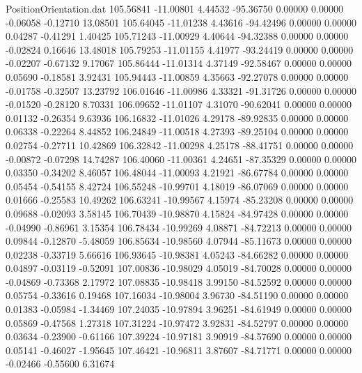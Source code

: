 \begin{filecontents}{PositionOrientation.dat}
 105.56841  -11.00801    4.44532   -95.36750    0.00000    0.00000   -0.06058   -0.12710   13.08501
 105.64045  -11.01238    4.43616   -94.42496    0.00000    0.00000    0.04287   -0.41291    1.40425
 105.71243  -11.00929    4.40644   -94.32388    0.00000    0.00000   -0.02824    0.16646   13.48018
 105.79253  -11.01155    4.41977   -93.24419    0.00000    0.00000   -0.02207   -0.67132    9.17067
 105.86444  -11.01314    4.37149   -92.58467    0.00000    0.00000    0.05690   -0.18581    3.92431
 105.94443  -11.00859    4.35663   -92.27078    0.00000    0.00000   -0.01758   -0.32507   13.23792
 106.01646  -11.00986    4.33321   -91.31726    0.00000    0.00000   -0.01520   -0.28120    8.70331
 106.09652  -11.01107    4.31070   -90.62041    0.00000    0.00000    0.01132   -0.26354    9.63936
 106.16832  -11.01026    4.29178   -89.92835    0.00000    0.00000    0.06338   -0.22264    8.44852
 106.24849  -11.00518    4.27393   -89.25104    0.00000    0.00000    0.02754   -0.27711   10.42869
 106.32842  -11.00298    4.25178   -88.41751    0.00000    0.00000   -0.00872   -0.07298   14.74287
 106.40060  -11.00361    4.24651   -87.35329    0.00000    0.00000    0.03350   -0.34202    8.46057
 106.48044  -11.00093    4.21921   -86.67784    0.00000    0.00000    0.05454   -0.54155    8.42724
 106.55248  -10.99701    4.18019   -86.07069    0.00000    0.00000    0.01666   -0.25583   10.49262
 106.63241  -10.99567    4.15974   -85.23208    0.00000    0.00000    0.09688   -0.02093    3.58145
 106.70439  -10.98870    4.15824   -84.97428    0.00000    0.00000   -0.04990   -0.86961    3.15354
 106.78434  -10.99269    4.08871   -84.72213    0.00000    0.00000    0.09844   -0.12870   -5.48059
 106.85634  -10.98560    4.07944   -85.11673    0.00000    0.00000    0.02238   -0.33719    5.66616
 106.93645  -10.98381    4.05243   -84.66282    0.00000    0.00000    0.04897   -0.03119   -0.52091
 107.00836  -10.98029    4.05019   -84.70028    0.00000    0.00000   -0.04869   -0.73368    2.17972
 107.08835  -10.98418    3.99150   -84.52592    0.00000    0.00000    0.05754   -0.33616    0.19468
 107.16034  -10.98004    3.96730   -84.51190    0.00000    0.00000    0.01383   -0.05984   -1.34469
 107.24035  -10.97894    3.96251   -84.61949    0.00000    0.00000    0.05869   -0.47568    1.27318
 107.31224  -10.97472    3.92831   -84.52797    0.00000    0.00000    0.03634   -0.23900   -0.61166
 107.39224  -10.97181    3.90919   -84.57690    0.00000    0.00000    0.05141   -0.46027   -1.95645
 107.46421  -10.96811    3.87607   -84.71771    0.00000    0.00000   -0.02466   -0.55600    6.31674

\end{filecontents}
